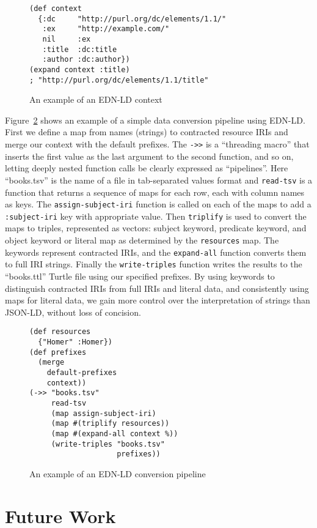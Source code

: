 \documentclass{icbo}
\begin{document}
\begin{figure}
\begin{verbatim}
(def context
  {:dc     "http://purl.org/dc/elements/1.1/"
   :ex     "http://example.com/"
   nil     :ex
   :title  :dc:title
   :author :dc:author})
(expand context :title)
; "http://purl.org/dc/elements/1.1/title"
\end{verbatim}
\caption{An example of an EDN-LD context}
\label{context}
\end{figure}

Figure~\ref{example} shows an example of a simple data conversion pipeline using EDN-LD. First we define a map from names (strings) to contracted resource IRIs and merge our context with the default prefixes. The {\tt ->>} is a ``threading macro'' that inserts the first value as the last argument to the second function, and so on, letting deeply nested function calls be clearly expressed as ``pipelines''. Here ``books.tsv'' is the name of a file in tab-separated values format and {\tt read-tsv} is a function that returns a sequence of maps for each row, each with column names as keys. The {\tt assign-subject-iri} function is called on each of the maps to add a {\tt :subject-iri} key with appropriate value. Then {\tt triplify} is used to convert the maps to triples, represented as vectors: subject keyword, predicate keyword, and object keyword or literal map as determined by the {\tt resources} map. The keywords represent contracted IRIs, and the {\tt expand-all} function converts them to full IRI strings. Finally the {\tt write-triples} function writes the results to the ``books.ttl'' Turtle file using our specified prefixes. By using keywords to distinguish contracted IRIs from full IRIs and literal data, and consistently using maps for literal data, we gain more control over the interpretation of strings than JSON-LD, without loss of concision.

\begin{figure}
\begin{verbatim}
(def resources
  {"Homer" :Homer})
(def prefixes
  (merge
    default-prefixes
    context))
(->> "books.tsv"
     read-tsv
     (map assign-subject-iri)
     (map #(triplify resources))
     (map #(expand-all context %))
     (write-triples "books.tsv"
                    prefixes))
\end{verbatim}
\caption{An example of an EDN-LD conversion pipeline}
\label{example}
\end{figure}


\section{Future Work}
\end{document}
